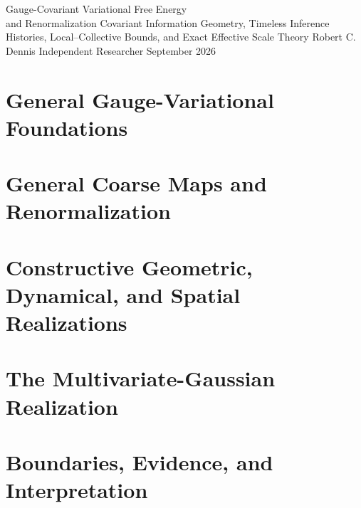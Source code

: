 \documentclass[11pt,letterpaper]{report}
\begin{document}
\hypersetup{pageanchor=false}
\makereporttitle
  {Gauge-Covariant Variational Free Energy\\and Renormalization}
  {Covariant Information Geometry, Timeless Inference Histories, Local--Collective Bounds, and Exact Effective Scale Theory}
  {Robert C. Dennis}
  {Independent Researcher}
  {September 2026}

\hypersetup{pageanchor=true}
\tableofcontents
\listoftables
\clearpage
{}

\part{General Gauge-Variational Foundations}










\part{General Coarse Maps and Renormalization}





\part{Constructive Geometric, Dynamical, and Spatial Realizations}








\part{The Multivariate-Gaussian Realization}







\part{Boundaries, Evidence, and Interpretation}



\appendix









\end{document}
